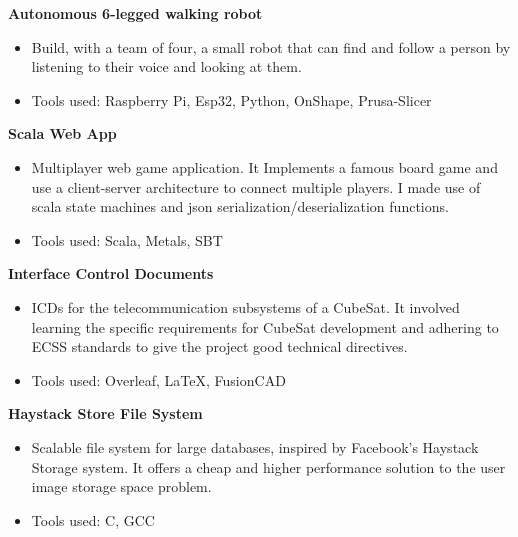 \documentclass[a4paper, 10pt]{article}
\newenvironment{highlights}{
    \begin{itemize}[
        topsep=0.10 cm,
        parsep=0.10 cm,
        partopsep=0pt,
        itemsep=0pt,
        leftmargin=0.4 cm + 10pt
    ]
}{
    \end{itemize}
} %
\let\hrefWithoutArrow\href
\renewcommand{\href}[2]{\hrefWithoutArrow{#1}{\ifthenelse{\equal{#2}{}}{ }{#2 }\raisebox{.15ex}{\footnotesize \faExternalLink*}}}
\begin{document}
        \textbf{Autonomous 6-legged walking robot}\href{https://github.com/epfl-cs358/2025sp-hexapolo}{}
        \begin{highlights}
            \item Build, with a team of four, a small robot that can find and follow a person by listening to their voice and looking at them.
            \item Tools used: Raspberry Pi, Esp32, Python, OnShape, Prusa-Slicer
        \end{highlights}
        \textbf{Scala Web App}\href{https://github.com/relogamimano/Scala-Web-App}{}
        \begin{highlights}
            \item Multiplayer web game application. It Implements a famous board game and use a client-server architecture to connect multiple players. I made use of scala state machines and json serialization/deserialization functions.
            \item Tools used: Scala, Metals, SBT
        \end{highlights}

        \textbf{Interface Control Documents}\href{https://drive.google.com/drive/folders/1KWNjMkGwcYpTIh6xBs-nddBK195R_ihb?usp=sharing}{}
        \begin{highlights}
            \item ICDs for the telecommunication subsystems of a CubeSat. It involved learning the specific requirements for CubeSat development and adhering to ECSS standards to give the project good technical directives.
            \item Tools used: Overleaf, LaTeX, FusionCAD
        \end{highlights}

        \textbf{Haystack Store File System}\href{https://github.com/relogamimano/haystack-store}{}
        \begin{highlights}
            \item Scalable file system for large databases, inspired by Facebook's Haystack Storage system. It offers a cheap and higher performance solution to the user image storage space problem.
            \item Tools used: C, GCC
        \end{highlights}
\end{document}
